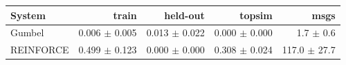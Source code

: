 \begin{tabular}{lrrrr}
\hline
System & train & held-out & topsim & msgs\\
\hline
Gumbel & 0.006 $\pm$ 0.005 & 0.013 $\pm$ 0.022 & 0.000 $\pm$ 0.000 & 1.7 $\pm$ 0.6\\
REINFORCE & 0.499 $\pm$ 0.123 & 0.000 $\pm$ 0.000 & 0.308 $\pm$ 0.024 & 117.0 $\pm$ 27.7\\
\hline
\end{tabular}
